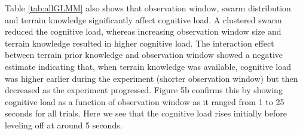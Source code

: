 \documentclass{article}
\begin{document}
	
	Table \ref{tab:allGLMM} also shows that observation window, swarm distribution and terrain knowledge significantly affect cognitive load. A clustered swarm reduced the cognitive load, whereas increasing observation window size and terrain knowledge resulted in higher cognitive load. The interaction effect between terrain prior knowledge and observation window showed a negative estimate indicating that, when terrain knowledge was available, cognitive load was higher earlier during the experiment (shorter observation window) but then decreased as the experiment progressed. Figure 5b confirms this by showing cognitive load as a function of observation window as it ranged from 1 to 25 seconds for all trials. Here we see that the cognitive load rises initially before leveling off at around 5 seconds.
	
	
	
	
\end{document}
